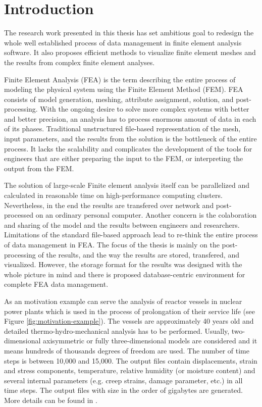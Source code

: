 \chapter{Introduction}
\label{chapter:introduction}

The research work presented in this thesis has set ambitious goal to redesign the whole well established process of data management in finite element analysis software. It also proposes efficient methods to visualize finite element meshes and the results from complex finite element analyses.

Finite Element Analysis (FEA) is the term describing the entire process of modeling the physical system using the Finite Element Method (FEM). FEA consists of model generation, meshing, attribute assignment, solution, and post-processing. With the ongoing desire to solve more complex systems with better and better precision, an analysis has to process enormous amount of data in each of its phases. Traditional unstructured file-based representation of the mesh, input parameters, and the results from the solution is the bottleneck of the entire process. It lacks the scalability and complicates the development of the tools for engineers that are either preparing the input to the FEM, or interpreting the output from the FEM.

The solution of large-scale Finite element analysis itself can be parallelized and calculated in reasonable time on high-performance computing clusters. Nevertheless, in the end the results are transfered over network and post-processed on an ordinary personal computer. Another concern is the colaboration and sharing of the model and the results between engineers and researchers. Limitations of the standard file-based approach lead to re-think the entire process of data management in FEA. The focus of the thesis is mainly on the post-processing of the results, and the way the results are stored, transfered, and visualized. However, the storage format for the results was designed with the whole picture in mind and there is proposed database-centric environment for complete FEA data management.

As an motivation example can serve the analysis of reactor vessels in nuclear power plants which is used in the process of prolongation of their service life (see Figure \ref{fig:motivation-example}). The vessels are approximately 40 years old and detailed thermo-hydro-mechanical analysis has to be performed. Usually, two-dimensional axisymmetric or fully three-dimensional models are considered and it means hundreds of thousands degrees of freedom are used. The number of time steps is between 10,000 and 15,000. The output files contain displacements, strain and stress components, temperature, relative humidity (or moisture content) and several internal parameters (e.g. creep strains, damage parameter, etc.) in all time steps. The output files with size in the order of gigabytes are generated. More details can be found in \cite{Kruis2010,Krejci2015}.

